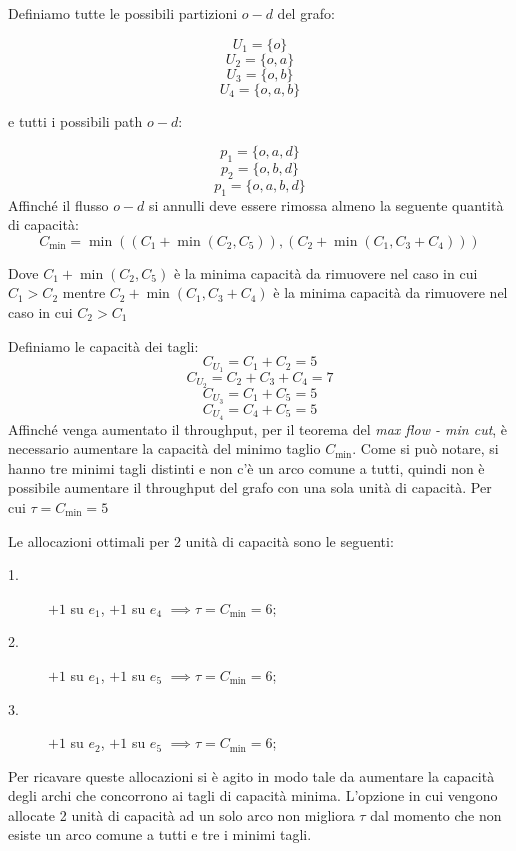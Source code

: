 \begin{alphaparts}
   \questionpart
    Definiamo tutte le possibili partizioni \(o - d\) del grafo:

        \[ U_1 = \{o\}\]
        \[U_2 = \{o, a\}\]
        \[U_3 = \{o, b\}\]
        \[U_4 = \{o, a, b\}\]

    e tutti i possibili path \(o- d\):

        \[p_1 = \{o, a, d\}\]
        \[p_2 = \{o, b, d\}\]
        \[p_1 = \{o, a, b, d\}\]
    Affinché il flusso \(o- d\) si annulli deve essere rimossa almeno la seguente quantità di capacità:
    \[C_{\min}= \min((C_1 + \min(C_2, C_5)), (C_2+\min(C_1, C_3+ C_4))) \]

    Dove \(C_1 + \min(C_2, C_5)\) è la minima capacità da rimuovere nel caso in cui \(C_1> C_2\) mentre \(C_2+\min(C_1, C_3+ C_4)\) è la minima capacità da rimuovere nel caso in cui \(C_2 > C_1\)
    

    \questionpart

    Definiamo le capacità dei tagli:
    \[C_{U_1} = C_1 + C_2 = 5\]
    \[C_{U_2} = C_2 + C_3 + C_4 = 7\]
    \[C_{U_3} = C_1 + C_5 = 5\]
    \[C_{U_4} = C_4 + C_5 = 5\]
    Affinché venga aumentato il throughput, per il teorema del \textit{max flow - min cut}, è necessario aumentare la capacità del minimo taglio \(C_{\min}\).
    Come si può notare, si hanno tre minimi tagli distinti e non c'è un arco comune a tutti, quindi non è possibile aumentare il throughput del grafo con una sola unità di capacità. Per cui \(\tau = C_{\min } = 5\)


    \questionpart
    Le allocazioni ottimali per 2 unità di capacità sono le seguenti:

    \begin{description}
        \item[1.] \(+ 1\) su \(e_1\), \(+ 1\) su \(e_4\) \(\implies \tau = C_{\min} = 6\);
        \item[2.] \(+ 1\) su \(e_1\), \(+ 1\) su \(e_5\) \(\implies \tau = C_{\min} = 6\);
        \item[3.] \(+ 1\) su \(e_2\), \(+ 1\) su \(e_5\) \(\implies \tau = C_{\min} = 6\); 
    \end{description}

    Per ricavare queste allocazioni si è agito in modo tale da aumentare la capacità degli archi che concorrono ai tagli di capacità minima. L'opzione in cui vengono allocate 2 unità di capacità ad un solo arco non migliora \(\tau\) dal momento che non esiste un arco comune a tutti e tre i minimi tagli.


\end{alphaparts}
